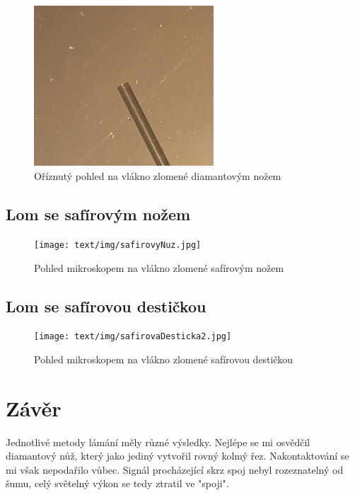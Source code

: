     \begin{figure}[h!]
      \centering
      \includegraphics[width=0.6\textwidth]{text/img/diamantovyNuz-O.jpg}
      \caption{\label{fig:diamNuz-O} Oříznutý pohled na vlákno zlomené diamantovým nožem}
    \end{figure}

  \newpage
  \clearpage
  
  \vspace{-3mm}
  
  \subsection{Lom se safírovým nožem}
  
  \vspace{-3mm}

  \begin{figure}[h!]
    \centering
    \texttt{[image: text/img/safirovyNuz.jpg]} 
    \caption{\label{fig:safirNuz} Pohled mikroskopem na vlákno zlomené safírovým nožem}
  \end{figure}

  \vspace{-3mm}

  \subsection{Lom se safírovou destičkou}
    \vspace{-3mm}
    \begin{figure}[h!]
      \centering
      \texttt{[image: text/img/safirovaDesticka2.jpg]} 
      \caption{\label{fig:safirNuz} Pohled mikroskopem na vlákno zlomené safírovou destičkou}
    \end{figure}
  
  \vspace{-3mm}

  \section{Závěr}
  Jednotlivé metody lámání měly různé výsledky.
  Nejlépe se mi osvědčil diamantový nůž, který jako jediný vytvořil rovný kolmý řez.
  Nakontaktování se mi však nepodařilo vůbec. Signál procházející skrz spoj nebyl rozeznatelný od šumu, celý světelný výkon se tedy ztratil ve "spoji".